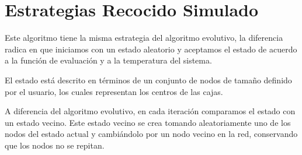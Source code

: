 \section{Estrategias Recocido Simulado}

Este algoritmo tiene la misma estrategia del algoritmo evolutivo, la diferencia radica en que iniciamos con un estado aleatorio y aceptamos el estado de acuerdo a la función de evaluación y a la temperatura del sistema.

El estado está descrito en términos de un conjunto de nodos de tamaño definido por el usuario, los cuales representan los centros de las cajas.

A diferencia del algoritmo evolutivo, en cada iteración comparamos el estado con un estado vecino. Este estado vecino se crea tomando aleatoriamente uno de los nodos del estado actual y cambiándolo por un nodo vecino en la red, conservando que los nodos no se repitan.